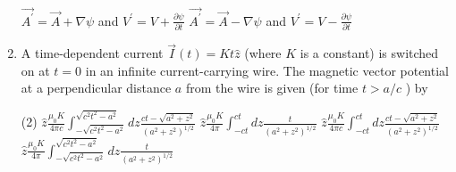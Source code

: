 \begin{enumerate}
\begin{tasks}
			\task[\textbf{C.}] $\overrightarrow{A^{\prime}}=\vec{A}+\nabla \psi$ and $V^{\prime}=V+\frac{\partial \psi}{\partial t}$
			\task[\textbf{D.}] $\overrightarrow{A^{\prime}}=\vec{A}-\nabla \psi$ and $V^{\prime}=V-\frac{\partial \psi}{\partial t}$
		\end{tasks}
\item
		A time-dependent current $\vec{I}(t)=K t \hat{z}$ (where $K$ is a constant) is switched on at $t=0$ in an infinite current-carrying wire. The magnetic vector potential at a perpendicular distance $a$ from the wire is given (for time $t>a / c$ ) by
	{	}
		\begin{tasks}(2)
			\task[\textbf{A.}]  $\hat{z} \frac{\mu_{0} K}{4 \pi c} \int_{-\sqrt{c^{2} t^{2}-a^{2}}}^{\sqrt{c^{2} t^{2}-a^{2}}} d z \frac{c t-\sqrt{a^{2}+z^{2}}}{\left(a^{2}+z^{2}\right)^{1 / 2}}$
			\task[\textbf{B.}]  $\hat{z} \frac{\mu_{0} K}{4 \pi} \int_{-c t}^{c t} d z \frac{t}{\left(a^{2}+z^{2}\right)^{1 / 2}}$
			\task[\textbf{C.}] $\hat{z} \frac{\mu_{0} K}{4 \pi c} \int_{-c t}^{c t} d z \frac{c t-\sqrt{a^{2}+z^{2}}}{\left(a^{2}+z^{2}\right)^{1 / 2}}$
			\task[\textbf{D.}] $\hat{z} \frac{\mu_{0} K}{4 \pi} \int_{-\sqrt{c^{2} t^{2}-a^{2}}}^{\sqrt{c^{2} t^{2}-a^{2}}} d z \frac{t}{\left(a^{2}+z^{2}\right)^{1 / 2}}$
		\end{tasks}
	
	
	
	
	

\end{enumerate}
